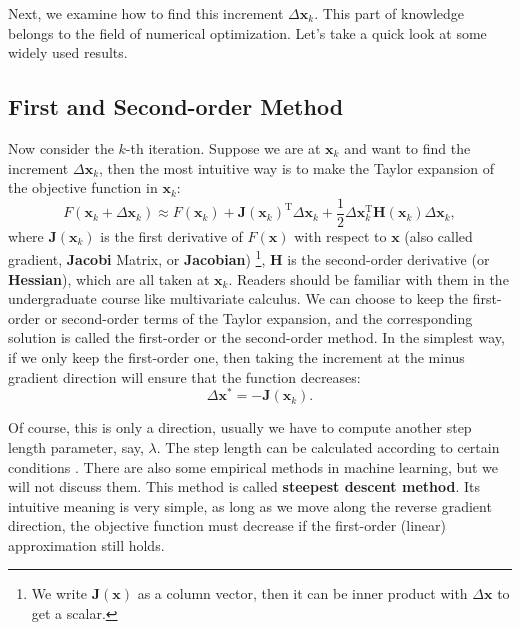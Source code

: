 Next, we examine how to find this increment $\Delta \mathbf{x}_k$. This part of knowledge belongs to the field of numerical optimization. Let's take a quick look at some widely used results.

\subsection{First and Second-order Method}
Now consider the $k$-th iteration. Suppose we are at $\mathbf{x}_k$ and want to find the increment $\Delta \mathbf{x}_k$, then the most intuitive way is to make the Taylor expansion of the objective function in $\mathbf{x}_k$:
\begin{equation}
    F(\mathbf{x}_k+\Delta \mathbf{x}_k) \approx F{\left( \mathbf{x}_k \right)} + \mathbf{J} \left( \mathbf{x}_k \right) ^\mathrm{T} \Delta \mathbf{x}_k + \frac{1}{2}\Delta {\mathbf{x}_k^\mathrm{T}}\mathbf{H}(\mathbf{ x}_k) \Delta \mathbf{x}_k,
\end{equation}
where $\mathbf{J}(\mathbf{x}_k)$ is the first derivative of $F(\mathbf{x})$ with respect to $\mathbf{x}$ (also called gradient, \textbf{Jacobi} Matrix, or \textbf{Jacobian}) \footnote{We write $\mathbf{J}(\mathbf{x})$ as a column vector, then it can be inner product with $\Delta \mathbf{x}$ to get a scalar. }, $\mathbf{H}$ is the second-order derivative (or \textbf{Hessian}), which are all taken at $\mathbf{x}_k$. Readers should be familiar with them in the undergraduate course like multivariate calculus. We can choose to keep the first-order or second-order terms of the Taylor expansion, and the corresponding solution is called the first-order or the second-order method. In the simplest way, if we only keep the first-order one, then taking the increment at the minus gradient direction will ensure that the function decreases: 
\begin{equation}
    \Delta \mathbf{x}^* =-\mathbf{J}(\mathbf{x}_k).
\end{equation}

Of course, this is only a direction, usually we have to compute another step length parameter, say, $\lambda$. The step length can be calculated according to certain conditions \textsuperscript{\cite{Wolfe1969}}. There are also some empirical methods in machine learning, but we will not discuss them. This method is called \textbf{steepest descent method}. Its intuitive meaning is very simple, as long as we move along the reverse gradient direction, the objective function must decrease if the first-order (linear) approximation still holds.

